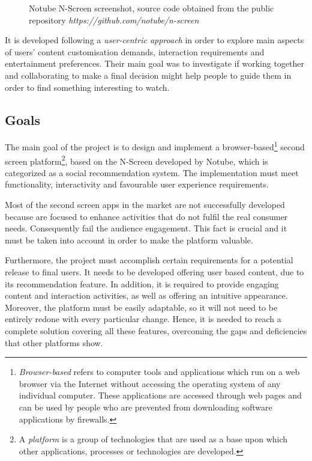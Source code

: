 \documentclass{acm_proc_article-sp}
\begin{document}
\begin{figure}[!htb]
	\centering
	\caption{Notube N-Screen screenshot, source code obtained from the public repository \textit{https://github.com/notube/n-screen}}
	\label{fig:oldnotubenscreen}
\end{figure}

It is developed following a \textit{user-centric approach} in order to explore main aspects of users' content customisation demands, interaction requirements and entertainment preferences. Their main goal was to investigate if working together and collaborating to make a final decision  might help people to guide them in order to find something interesting to watch. 

\subsection{Goals}

The main goal of the project is to design and implement a browser-based\footnote{\textit{Browser-based} refers to computer tools and applications which run on a web browser via the Internet without accessing the operating system of any individual computer. These applications are accessed through web pages and can be used by people who are prevented from downloading software applications by firewalls.} second screen platform\footnote{A \textit{platform} is a group of technologies that are used as a base upon which other applications, processes or technologies are developed.}, based on the N-Screen developed by Notube, which is categorized as a social recommendation system. The implementation must meet functionality, interactivity and favourable user experience requirements. 

Most of the second screen apps in the market are not successfully developed because are focused to enhance activities  that do not fulfil the real consumer needs\cite{evolumedia1}. Consequently fail the audience engagement. This fact is crucial and it must be taken into account in order to make the platform valuable.

Furthermore, the project must accomplish certain requirements for a potential release to final users. It needs to be developed offering user based content, due to its recommendation feature. In addition, it is required to provide engaging content and interaction activities, as well as offering an intuitive appearance. Moreover, the platform must be easily adaptable, so it will not need to be entirely redone with every particular change. Hence, it is needed to reach a complete solution covering all these features, overcoming the gaps and deficiencies that other platforms show.
\end{document}
